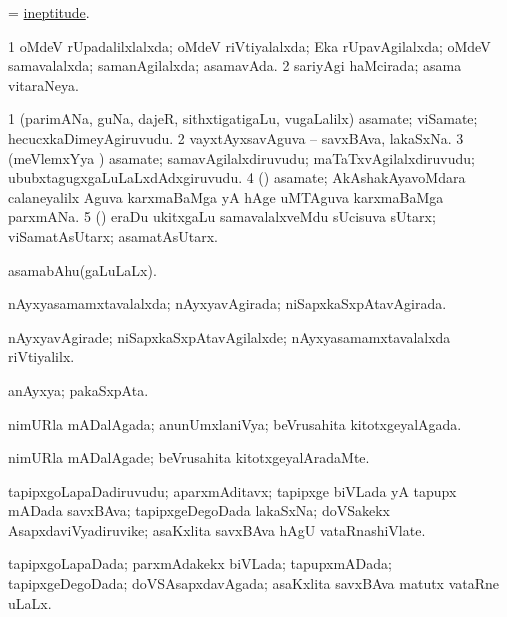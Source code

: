 \bentry
{}
\gl{\nA}
\bmng
 = \hyperlink{ineptitude}{ineptitude}. 
\emng
\eentry

\bentry
{}
\gl{\gu}
\bmng
\bnum
\num{1} oMdeV rUpadalilxlalxda; oMdeV riVtiyalalxda; Eka rUpavAgilalxda; oMdeV samavalalxda; samanAgilalxda; asamavAda. 
\num{2} sariyAgi haMcirada; asama vitaraNeya. 
\enum
\emng
\eentry

\bentry
{}
\gl{\nA}
\bmng
\bnum
\num{1} (parimANa, guNa, dajeR, sithxtigatigaLu, \mo vugaLalilx) asamate; viSamate; hecucxkaDimeyAgiruvudu. 
\num{2} vayxtAyxsavAguva -- savxBAva, lakaSxNa. 
\num{3} (meVlemxYya \vi) asamate; samavAgilalxdiruvudu; maTaTxvAgilalxdiruvudu; ububxtagugxgaLuLaLxdAdxgiruvudu. 
\num{4} (\Kavi) asamate; AkAshakAyavoMdara calaneyalilx Aguva karxmaBaMga yA hAge uMTAguva karxmaBaMga parxmANa. 
\num{5} (\ga) eraDu ukitxgaLu samavalalxveMdu sUcisuva sUtarx; viSamatAsUtarx; asamatAsUtarx. 
\enum
\emng
\eentry

\bentry
{}
\gl{\gu}
\bmng
asamabAhu(gaLuLaLx). 
\emng
\eentry

\bentry
{}
\gl{\gu}
\bmng
nAyxyasamamxtavalalxda; nAyxyavAgirada; niSapxkaSxpAtavAgirada. 
\emng
\eentry

\bentry
{}
\gl{\kirxvi}
\bmng
nAyxyavAgirade; niSapxkaSxpAtavAgilalxde; nAyxyasamamxtavalalxda riVtiyalilx. 
\emng
\eentry

\bentry
{}
\gl{\nA}
\bmng
anAyxya; pakaSxpAta. 
\emng
\eentry

\bentry
{}
\gl{\gu}
\bmng
nimURla mADalAgada; anunUmxlaniVya; beVrusahita kitotxgeyalAgada. 
\emng
\eentry

\bentry
{}
\gl{\kirxvi}
\bmng
nimURla mADalAgade; beVrusahita kitotxgeyalAradaMte. 
\emng
\eentry

\bentry
{}
\gl{\nA}
\bmng
tapipxgoLapaDadiruvudu; aparxmAditavx; tapipxge biVLada yA tapupx mADada savxBAva; tapipxgeDegoDada lakaSxNa; doVSakekx AsapxdaviVyadiruvike; asaKxlita savxBAva hAgU vataRnashiVlate. 
\emng
\eentry

\bentry
{}
\gl{\gu}
\bmng
tapipxgoLapaDada; parxmAdakekx biVLada; tapupxmADada; tapipxgeDegoDada; doVSAsapxdavAgada; asaKxlita savxBAva matutx vataRne uLaLx. 
\emng
\eentry

